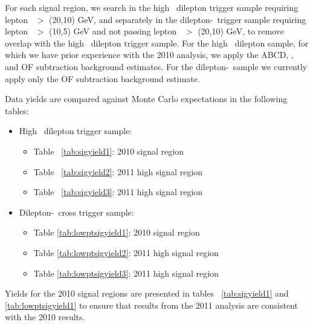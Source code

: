 For each signal region, we search in the high \pt\ dilepton trigger sample
requiring lepton \pt\ $>$ (20,10) GeV, and separately in the dilepton-\Ht\ trigger
sample requiring lepton \pt\ $>$ (10,5) GeV and not passing lepton \pt\ $>$ (20,10) GeV,
to remove overlap with the high \pt\ dilepton trigger sample. For the high \pt\ dilepton
sample, for which we have prior experience with the 2010 analysis, we apply the 
ABCD, \ptll, and OF subtraction background estimates. For the dilepton-\Ht\ sample
we currently apply only the OF subtraction background estimate.

Data yields are compared against Monte Carlo expectations in the following tables:

\begin{itemize}
  \item High \pt\ dilepton trigger sample:
    \begin{itemize}
      \item Table ~\ref{tab:sigyield1}: 2010 signal region
      \item Table ~\ref{tab:sigyield2}: 2011 high \met signal region
      \item Table ~\ref{tab:sigyield3}: 2011 high \Ht signal region
    \end{itemize}
  \item Dilepton-\Ht\ cross trigger sample:
    \begin{itemize}
         \item Table \ref{tab:lowptsigyield1}: 2010 signal region
         \item Table \ref{tab:lowptsigyield2}: 2011 high \met signal region
         \item Table \ref{tab:lowptsigyield3}: 2011 high \Ht signal region
    \end{itemize}
\end{itemize}

Yields for the 2010 signal regions are presented in tables ~\ref{tab:sigyield1} and \ref{tab:lowptsigyield1}
to ensure that results from the 2011 analysis are consistent with the 2010 results.


\newpage

